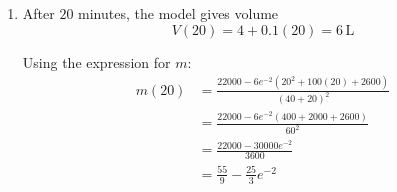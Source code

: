\documentclass[leqno]{article}
\begin{document}
\begin{enumerate}[
  label=\textbf{\arabic*.},
  leftmargin=*,
  topsep=0pt,
  partopsep=0pt,
  parsep=0pt
]
\begin{djsSolution}
\begin{enumerate}[label=\textbf{(\alph*)}]
Hence
\begin{align*}
J
&=uv-\int v\frac{\mathrm{d}u}{\mathrm{d}t}\,\mathrm{d}t \\
&=-10(t+40)e^{-0.1t}+10\int e^{-0.1t}\,\mathrm{d}t \\
&=-10(t+40)e^{-0.1t}-100e^{-0.1t}+c_1 \\
&=-10(t+50)e^{-0.1t}+c_1
\end{align*}

Substituting this into the expression for \(I\), and writing \(c=12c_1\):
\begin{align*}
I
&=-6(t^2+80t+1600)e^{-0.1t}
  +12\bigl(-10(t+50)e^{-0.1t}\bigr)+c \\
&=-6e^{-0.1t}\bigl(t^2+80t+1600+20t+1000\bigr)+c \\
&=-6e^{-0.1t}(t^2+100t+2600)+c
\end{align*}

Therefore
\[
\int 0.6(t^2+80t+1600)e^{-0.1t}\,\mathrm{d}t
=-6e^{-0.1t}(t^2+100t+2600)+c
\]

where \(c\) is a constant.

So
\[
(40+t)^2m=-6e^{-0.1t}(t^2+100t+2600)+c
\]

Now use the initial condition \(m=4\) when \(t=0\):
\begin{align*}
(40)^2(4)
&=-6e^{0}(0^2+100(0)+2600)+c \\
6400
&=-6(2600)+c \\
6400
&=-15600+c
\end{align*}

Thus
\[
c=22000
\]

Hence
\[
(40+t)^2m=22000-6e^{-0.1t}(t^2+100t+2600)
\]

and so
\[
m=\frac{22000-6e^{-0.1t}(t^2+100t+2600)}{(40+t)^2}
\]

Therefore, the amount of dye is
\[
m(t)=\frac{22000-6e^{-0.1t}(t^2+100t+2600)}{(40+t)^2}\,\mathrm{mg}
\]

  \item After \(20\) minutes, the model gives volume
\[
V(20)=4+0.1(20)=6\,\mathrm{L}
\]

Using the expression for \(m\):
\begin{align*}
m(20)
&=\frac{22000-6e^{-2}(20^2+100(20)+2600)}{(40+20)^2} \\
&=\frac{22000-6e^{-2}(400+2000+2600)}{60^2} \\
&=\frac{22000-30000e^{-2}}{3600} \\
&=\frac{55}{9}-\frac{25}{3}e^{-2}
\end{align*}


\end{enumerate}
\end{djsSolution}
\end{enumerate}
\end{document}
